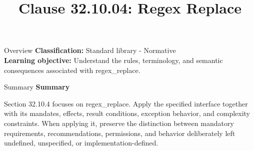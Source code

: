 \documentclass[10pt,letterpaper]{article}
\title{Clause 32.10.04: Regex Replace}
\author{}
\date{}
\begin{document}
\maketitle
\begin{CornellOverviewBox}{Overview}
\textbf{Classification:} Standard library - Normative\\[2pt]
\textbf{Learning objective:} Understand the rules, terminology, and semantic consequences associated with regex\_replace.
\end{CornellOverviewBox}\begin{CornellSummaryBox}{Summary}
{\sffamily\bfseries\color{Accent} Summary}\par\vspace{3pt}Section 32.10.4 focuses on regex\_replace. Apply the specified interface together with its mandates, effects, result conditions, exception behavior, and complexity constraints. When applying it, preserve the distinction between mandatory requirements, recommendations, permissions, and behavior deliberately left undefined, unspecified, or implementation-defined.
\end{CornellSummaryBox}
\end{document}
